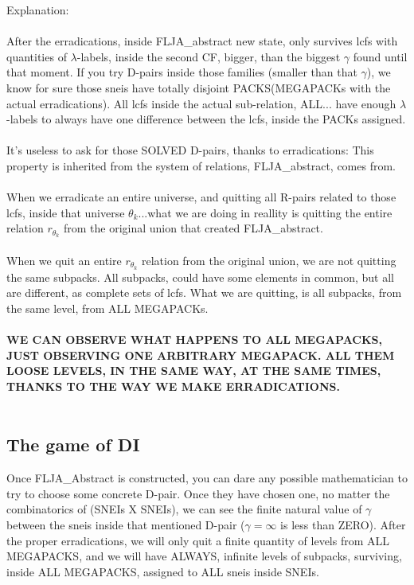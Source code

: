 			\noindent
			Explanation:\\\\
			After the erradications, inside FLJA\_abstract new state, only survives lcfs with quantities of $\lambda$-labels, inside the second CF, bigger, than the biggest $\gamma$ found until that moment. If you try D-pairs inside those families (smaller than that $\gamma$), we know for sure those sneis have totally disjoint PACKS(MEGAPACKs with the actual erradications). All lcfs inside the actual sub-relation, ALL... have enough $\lambda$-labels to always have one difference between the lcfs, inside the PACKs assigned.\\\\
			It's useless to ask for those SOLVED D-pairs, thanks to erradications: This property is inherited from the system of relations, FLJA\_abstract, comes from.\\\\
			When we erradicate an entire universe, and quitting all R-pairs related to those lcfs, inside that universe $\theta_{k}$...what we are doing in reallity is quitting the entire relation $r_{\theta_{k}}$ from the original union that created FLJA\_abstract.\\\\
			When we quit an entire $r_{\theta_{k}}$ relation from the original union, we are not quitting the same subpacks. All subpacks, could have some elements in common, but all are different, as complete sets of lcfs. What we are quitting, is all subpacks, from the same level, from ALL MEGAPACKs.\\\\
			\textbf{WE CAN OBSERVE WHAT HAPPENS TO ALL MEGAPACKS, JUST OBSERVING ONE ARBITRARY MEGAPACK. ALL THEM LOOSE LEVELS, IN THE SAME WAY, AT THE SAME TIMES, THANKS TO THE WAY WE MAKE ERRADICATIONS.}
			\\\\
		
		\newpage
		\subsection{The game of DI}
		
			\noindent
			Once FLJA\_Abstract is constructed, you can dare any possible mathematician to try to choose some concrete D-pair. Once they have chosen one, no matter the combinatorics of (SNEIs X SNEIs), we can see the finite natural value of $\gamma$ between the sneis inside that mentioned D-pair ($\gamma=\infty$ is less than ZERO). After the proper erradications, we will only quit a finite quantity of levels from ALL MEGAPACKS, and we will have ALWAYS, infinite levels of subpacks, surviving, inside ALL MEGAPACKS, assigned to ALL sneis inside SNEIs.
			\\\\
			
